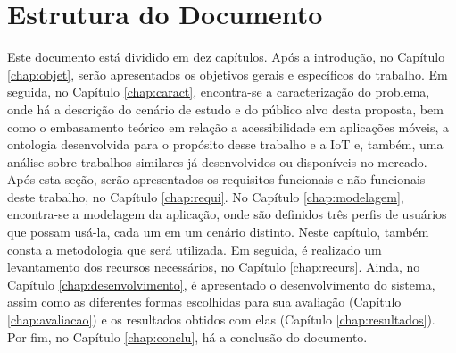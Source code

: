 \section{Estrutura do Documento}
Este documento está dividido em dez capítulos. Após a introdução, no Capítulo \ref{chap:objet}, serão apresentados os objetivos gerais e específicos do trabalho. Em seguida, no Capítulo \ref{chap:caract}, encontra-se a caracterização do problema, onde há a descrição do cenário de estudo e do público alvo desta proposta, bem como o embasamento teórico em relação a acessibilidade em aplicações móveis, a ontologia desenvolvida para o propósito desse trabalho e a IoT e, também, uma análise sobre trabalhos similares já desenvolvidos ou disponíveis no mercado. Após esta seção, serão apresentados os requisitos funcionais e não-funcionais deste trabalho, no Capítulo \ref{chap:requi}. No Capítulo \ref{chap:modelagem}, encontra-se a modelagem da aplicação, onde são definidos três perfis de usuários que possam usá-la, cada um em um cenário distinto. Neste capítulo, também consta a metodologia que será utilizada. Em seguida, é realizado um levantamento dos recursos necessários, no Capítulo \ref{chap:recurs}. Ainda, no Capítulo \ref{chap:desenvolvimento}, é apresentado o desenvolvimento do sistema, assim como as diferentes formas escolhidas para sua avaliação (Capítulo \ref{chap:avaliacao}) e os resultados obtidos com elas (Capítulo \ref{chap:resultados}). Por fim, no Capítulo \ref{chap:conclu}, há a conclusão do documento.